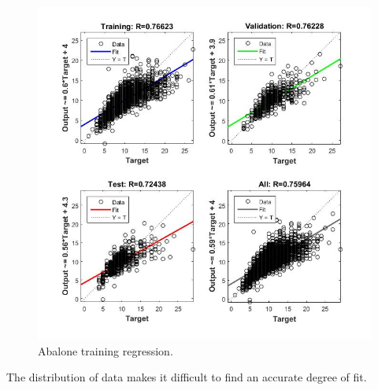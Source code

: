 \documentclass{article}%
\begin{document}
\begin{figure}[H]
\centering
\includegraphics[scale=0.5]{Abalone/regression.jpg}
\caption{Abalone training regression.}
\label{fig:abtrain}
\end{figure}
The distribution of data makes it difficult to find an accurate degree of fit.
\end{document}
